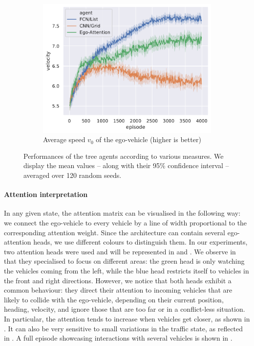 \begin{figure}[htp]
	\begin{subfigure}[t]{0.49\linewidth}
		\includegraphics[width=\linewidth]{img/velocity}
		\caption{Average speed $v_0$ of the ego-vehicle (higher is better)}
		\label{fig:attention-velocity}
	\end{subfigure}
	\caption{Performances of the tree agents according to various measures. We display the mean values -- along with their 95\% confidence interval -- averaged over 120 random seeds.}
	\label{fig:attention-results}
\end{figure}

\paragraph{Attention interpretation}

In any given state, the attention matrix can be visualised in the following way: we connect the ego-vehicle to every vehicle by a line of width proportional to the corresponding attention weight. Since the architecture can contain several ego-attention heads, we use different colours to distinguish them. In our experiments, two attention heads were used and will be represented in  and . We observe in  that they specialised to focus on different areas: the green head is only watching the vehicles coming from the left, while the blue head restricts itself to vehicles in the front and right directions. However, we notice that both heads exhibit a common behaviour: they direct their attention to incoming vehicles that are likely to collide with the ego-vehicle, depending on their current position, heading, velocity, and ignore those that are too far or in a conflict-less situation. In particular, the attention tends to increase when vehicles get closer, as shown in . It can also be very sensitive to small variations in the traffic state, as reflected in . A full episode showcasing interactions with several vehicles is shown in .



